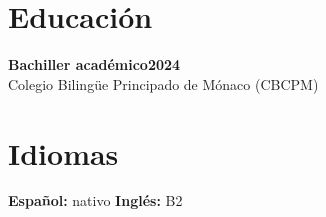 \documentclass[10pt,letterpaper]{article}
\begin{document}
\section{Educaci\'on}

\textbf{Bachiller acad\'emico}\hfill\textbf{2024}\\
Colegio Biling\"ue Principado de M\'onaco (CBCPM)

\section{Idiomas}

\textbf{Espa\~nol:} nativo \hspace{1.5em} \textbf{Ingl\'es:} B2
\end{document}
